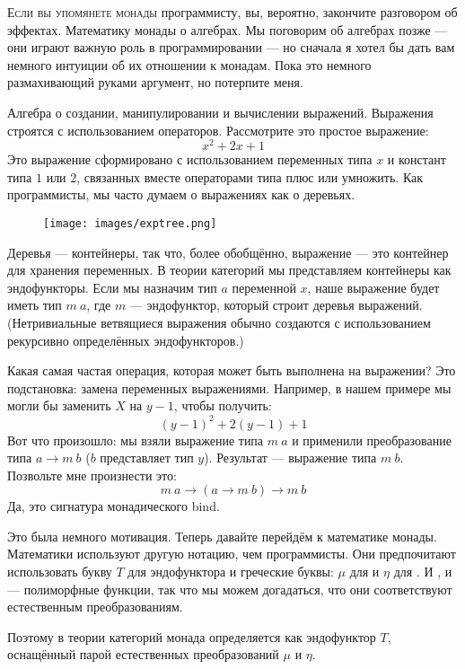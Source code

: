 
\lettrine[lhang=0.17]{Е}{сли вы упомянете монады} программисту, вы, вероятно, закончите разговором
об эффектах. Математику монады о алгебрах. Мы поговорим
об алгебрах позже --- они играют важную роль в программировании ---
но сначала я хотел бы дать вам немного интуиции об их отношении
к монадам. Пока это немного размахивающий руками аргумент, но потерпите
меня.

Алгебра о создании, манипулировании и вычислении выражений.
Выражения строятся с использованием операторов. Рассмотрите это простое выражение:
\[x^2 + 2 x + 1\]
Это выражение сформировано с использованием переменных типа $x$ и констант
типа $1$ или $2$, связанных вместе операторами типа плюс или умножить. Как
программисты, мы часто думаем о выражениях как о деревьях.

\begin{figure}[H]
  \centering
  \texttt{[image: images/exptree.png]}
\end{figure}

\noindent
Деревья --- контейнеры, так что, более обобщённо, выражение --- это контейнер
для хранения переменных. В теории категорий мы представляем контейнеры как
эндофункторы. Если мы назначим тип $a$ переменной
$x$, наше выражение будет иметь тип $m\ a$, где
$m$ --- эндофунктор, который строит деревья выражений. (Нетривиальные
ветвящиеся выражения обычно создаются с использованием рекурсивно определённых
эндофункторов.)

Какая самая частая операция, которая может быть выполнена на выражении?
Это подстановка: замена переменных выражениями. Например,
в нашем примере мы могли бы заменить $X$ на $y - 1$, чтобы
получить:
\[(y - 1)^2 + 2 (y - 1) + 1\]
Вот что произошло: мы взяли выражение типа $m\ a$ и
применили преобразование типа $a \to m\ b$
($b$ представляет тип $y$). Результат ---
выражение типа $m\ b$. Позвольте мне произнести это:
\[m\ a \to (a \to m\ b) \to m\ b\]
Да, это сигнатура монадического bind.

Это была немного мотивация. Теперь давайте перейдём к математике монады.
Математики используют другую нотацию, чем программисты. Они предпочитают
использовать букву $T$ для эндофунктора и греческие буквы: $\mu$ для
 и $\eta$ для . И , и
 --- полиморфные функции, так что мы можем догадаться, что они
соответствуют естественным преобразованиям.

Поэтому в теории категорий монада определяется как эндофунктор
$T$, оснащённый парой естественных преобразований $\mu$ и $\eta$.

